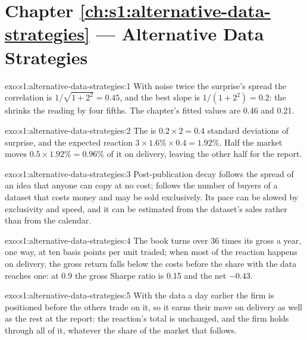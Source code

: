 \section*{Chapter \ref{ch:s1:alternative-data-strategies} --- Alternative Data Strategies}

\begin{solution}{exo:s1:alternative-data-strategies:1}
With noise twice the surprise's spread the correlation is $1/\sqrt{1 + 2^2} = 0.45$, and the best slope is $1/(1 + 2^2) = 0.2$: the  shrinks the reading
by four fifths. The chapter's fitted values are 0.46 and 0.21.
\end{solution}

\begin{solution}{exo:s1:alternative-data-strategies:2}
The  is $0.2 \times 2 = 0.4$ standard deviations of surprise, and the expected reaction $3 \times 1.6\% \times 0.4 = 1.92\%$. Half the market moves
$0.5 \times 1.92\% = 0.96\%$ of it on delivery, leaving the other half for the report.
\end{solution}

\begin{solution}{exo:s1:alternative-data-strategies:3}
Post-publication decay follows the spread of an idea that anyone can copy at no cost;  follows the number of buyers of a dataset that costs money
and may be sold exclusively. Its pace can be slowed by exclusivity and speed, and it can be estimated from the dataset's sales rather than from the calendar.
\end{solution}

\begin{solution}{exo:s1:alternative-data-strategies:4}
The book turns over 36 times its gross a year, one way, at ten basis points per unit traded; when most of the reaction happens on delivery, the gross return falls below the
costs before the share with the data reaches one: at 0.9 the gross Sharpe ratio is 0.15 and the net $-0.43$.
\end{solution}

\begin{solution}{exo:s1:alternative-data-strategies:5}
With the data a day earlier the firm is positioned before the others trade on it, so it earns their move on delivery as well as the rest at the report:
the reaction's total is unchanged, and the firm holds through all of it, whatever the share of the market that follows.
\end{solution}

